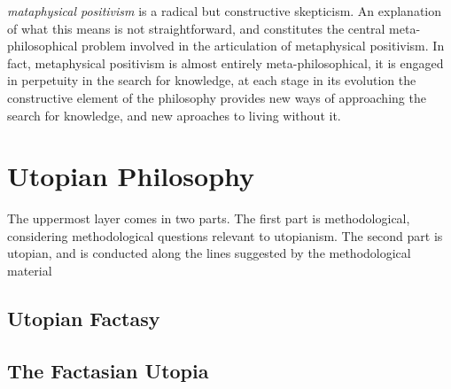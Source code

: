 \documentclass{rbjk}
\begin{document}
\begin{article}
{\it mataphysical positivism} is a radical but constructive skepticism.
An explanation of what this means is not straightforward, and constitutes the central meta-philosophical problem involved in the articulation of metaphysical positivism.
In fact, metaphysical positivism is almost entirely meta-philosophical, it is engaged in perpetuity in the search for knowledge, at each stage in its evolution the constructive element of the philosophy provides new ways of approaching the search for knowledge, and new aproaches to living without it.

\section{Utopian Philosophy}

The uppermost layer comes in two parts.
The first part is methodological, considering methodological questions relevant to utopianism.
The second part is utopian, and is conducted along the lines suggested by the methodological material

\subsection{Utopian Factasy}

\subsection{The Factasian Utopia}



%
%

\end{article}
\end{document}
